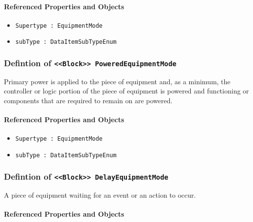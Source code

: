 \FloatBarrier
\paragraph{Referenced Properties and Objects}

\begin{itemize}
\item \texttt{Supertype : EquipmentMode}

\item \texttt{subType : DataItemSubTypeEnum}

\end{itemize}
\FloatBarrier
\subsubsection{Defintion of \texttt{<<Block>> PoweredEquipmentMode}}
  \label{type:PoweredEquipmentMode}

\FloatBarrier

Primary  power is  applied  to the  piece  of  equipment and,  as  a minimum, the controller or logic portion of the piece of equipment is powered and functioning or components that are required to remain on are powered.

\FloatBarrier
\paragraph{Referenced Properties and Objects}

\begin{itemize}
\item \texttt{Supertype : EquipmentMode}

\item \texttt{subType : DataItemSubTypeEnum}

\end{itemize}
\FloatBarrier
\subsubsection{Defintion of \texttt{<<Block>> DelayEquipmentMode}}
  \label{type:DelayEquipmentMode}

\FloatBarrier

A piece of equipment waiting for an event or an action to occur.

\FloatBarrier
\paragraph{Referenced Properties and Objects}

